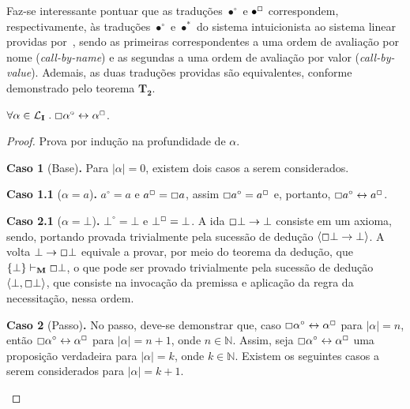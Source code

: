     Faz-se interessante pontuar que as traduções $\bullet^\circ$ e $\bullet^\Box$ correspondem, respectivamente, às traduções $\bullet^\circ$ e $\bullet^*$ do sistema intuicionista ao sistema linear providas por~\cite{Girard}, sendo as primeiras correspondentes a uma ordem de avaliação por nome (\textit{call-by-name}) e as segundas a uma ordem de avaliação por valor (\textit{call-by-value}). 
    Ademais, as duas traduções providas são equivalentes, conforme demonstrado pelo teorema $\mathbf{T_2}$.

    \begin{theorem}
        $\forall\alpha\in\mathcal{L}_\mathbf{I}\mathrel{.}\Box\alpha^\circ\leftrightarrow\alpha^\Box$.

        \begin{proof}
            Prova por indução na profundidade de $\alpha$.
    
            \begin{case}
                \textbf{Caso 1} (Base)\textbf{.}
                    Para $|\alpha| = 0$, existem dois casos a serem considerados.
    
                    \begin{casee}
                        \textbf{Caso 1.1} ($\alpha = a$)\textbf{.}
                        $a^\circ = a$ e $a^\Box = \Box a$, assim $\Box a^\circ = a^\Box$ e, portanto, $\Box a^\circ \leftrightarrow a^\Box$.
                    \end{casee}

                    \begin{casee}
                        \textbf{Caso 2.1} ($\alpha = \bot$)\textbf{.}
                        $\bot^\circ = \bot$ e $\bot^\Box = \bot$. A ida $\Box\bot\to\bot$ consiste em um axioma, sendo, portando provada trivialmente pela sucessão de dedução $\langle\Box\bot\to\bot\rangle$.
                        A volta $\bot\to\Box\bot$ equivale a provar, por meio do teorema da dedução, que $\{\bot\}\vdash_\mathbf{M}\Box\bot$, o que pode ser provado trivialmente pela sucessão de dedução $\langle\bot, \Box\bot\rangle$, que consiste na invocação da premissa e aplicação da regra da necessitação, nessa ordem.
                    \end{casee}
            \end{case}
    
            \begin{case}
                \textbf{Caso 2} (Passo)\textbf{.} No passo, deve-se demonstrar que, caso $\Box\alpha^\circ\leftrightarrow\alpha^\Box$ para $|\alpha| = n$, 
                então $\Box\alpha^\circ\leftrightarrow\alpha^\Box$ para $|\alpha| = n + 1$, onde $n \in \mathbb{N}$. Assim, seja $\Box\alpha^\circ\leftrightarrow\alpha^\Box$ uma proposição verdadeira para $|\alpha| = k$, onde $k \in \mathbb{N}$. Existem os seguintes casos a serem considerados para $|\alpha| = k + 1$.
            \end{case}
    

\end{proof}
\end{theorem}
